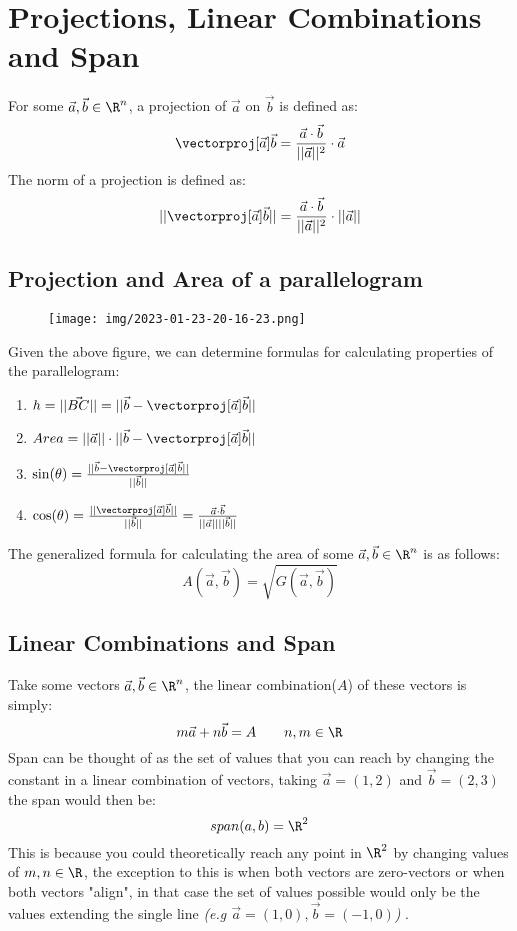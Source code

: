 \documentclass[a4paper]{article}
\begin{document}
  \section{Projections, Linear Combinations and Span} 
  For some $\vec{a},\vec{b} \in \R^n$, a projection of $\vec{a}$ on $\vec{b}$ is defined as:
  \[
    \vectorproj[\vec{a}]{\vec{b}} = \frac{\vec{a}\cdot\vec{b}}{||\vec{a}||^2} \cdot \vec{a}
  \]
  The norm of a projection is defined as:
  \[
    ||\vectorproj[\vec{a}]{\vec{b}}|| = \frac{\vec{a}\cdot\vec{b}}{||\vec{a}||^2}\cdot ||\vec{a}||
  \]
  \subsection{Projection and Area of a parallelogram}
  \begin{figure}[h]
    \begin{center}
      \texttt{[image: img/2023-01-23-20-16-23.png]}
    \end{center}
  \end{figure}
  
  Given the above figure, we can determine formulas for calculating properties of the parallelogram:

  \begin{enumerate}
    \item $h = ||\vec{BC}|| = ||\vec{b} - \vectorproj[\vec{a}]{\vec{b}}||$
    \item $Area = ||\vec{a}|| \cdot ||\vec{b} - \vectorproj[\vec{a}]{\vec{b}}||$
    \item $\sin(\theta) = \frac{||\vec{b}-\vectorproj[\vec{a}]{\vec{b}}||}{||\vec{b}||}$
    \item $\cos(\theta) = \frac{||\vectorproj[\vec{a}]{\vec{b}}||}{||\vec{b}||} = \frac{\vec{a}\cdot\vec{b}}{||\vec{a}||||\vec{b}||}$
  \end{enumerate}
  The generalized formula for calculating the area of some $\vec{a},\vec{b} \in \R^n$ is as follows:
  \[
    A(\vec{a},\vec{b}) = \sqrt{G(\vec{a},\vec{b})}
  \]
  \subsection{Linear Combinations and Span}
  Take some vectors $\vec{a},\vec{b} \in \R^n$, the linear combination($A$) of these vectors is simply:
  \[
    m \vec{a} + n\vec{b} = A\qquad n,m \in \R
  \]
  Span can be thought of as the set of values that you can reach by changing the constant in a linear combination of vectors, taking $\vec{a} = (1,2)$ and $\vec{b} = (2,3)$ the span would then be:
  \[
    span(a,b) = \R^2
  \]
  This is because you could theoretically reach any point in $\R^2$ by changing values of $m,n \in \R$, the exception to this is when both vectors are zero-vectors or when both vectors "align", in that case the set of values possible would only be the values extending the single line \textit{(e.g $\vec{a} = (1,0),\vec{b}=(-1,0)$) }.
\end{document}
